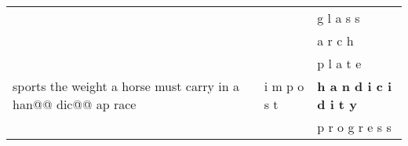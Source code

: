 \documentclass[11pt]{article}
\begin{document}
\begin{spacing}{1}
\begin{table}[!htpb]
\begin{tabular}{p{8cm} l p{5cm}}
                                                                                 &                 & g l a s s                                                                                                                                                                                                                                                                                                                                                                                                       \\
                                                                                 &                 & a r c h                                                                                                                                                                                                                                                                                                                                                                                                         \\
                                                                                 &                 & p l a t e                                                                                                                                                                                                                                                                                                                                                                                                       \\
sports the weight a horse must carry in a han@@ dic@@ ap race                    & i m p o s t     & \textbf{h a n d i c i d i t y}                                                                                                                                                                                                                                                                                                                                                                                           \\
                                                                                 &                 & p r o g r e s s                                                                                                                                                                                                                                                                                                                                                                                                 \\

\end{tabular}
\end{table}
\end{spacing}
\end{document}
